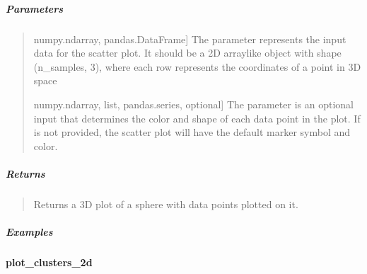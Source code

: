 \documentclass[letterpaper,10pt,english,openany,oneside]{sphinxmanual}
\begin{document}
{{{{\begin{fulllineitems}
\subparagraph{Parameters}
\label{\detokenize{api_reference/generated/QuadratiK.tools.sphere3d:parameters}}\begin{quote}
\begin{description}
\sphinxlineitem{x}{[}numpy.ndarray, pandas.DataFrame{]}
\sphinxAtStartPar
The parameter  represents the input data for the scatter plot.
It should be a 2D array\sphinxhyphen{}like object with shape (n\_samples, 3),
where each row represents the coordinates of a point in
3D space

\sphinxlineitem{y}{[}numpy.ndarray, list, pandas.series, optional{]}
\sphinxAtStartPar
The parameter  is an optional input that determines the color and
shape of each data point in the plot. If  is not provided, the
scatter plot will have the default marker symbol and color.

\end{description}
\end{quote}


\subparagraph{Returns}
\label{\detokenize{api_reference/generated/QuadratiK.tools.sphere3d:returns}}\begin{quote}

\sphinxAtStartPar
Returns a 3D plot of a sphere with data points plotted on it.
\end{quote}


\subparagraph{Examples}
\label{\detokenize{api_reference/generated/QuadratiK.tools.sphere3d:examples}}
\begin{sphinxVerbatim}[commandchars=\\\{\}]
   
  
\end{sphinxVerbatim}

\end{fulllineitems}




\sphinxstepscope


\paragraph{plot\_clusters\_2d}
\label{\detokenize{api_reference/generated/QuadratiK.tools.plot_clusters_2d:plot-clusters-2d}}\label{\detokenize{api_reference/generated/QuadratiK.tools.plot_clusters_2d::doc}}

}}}}
\end{document}
